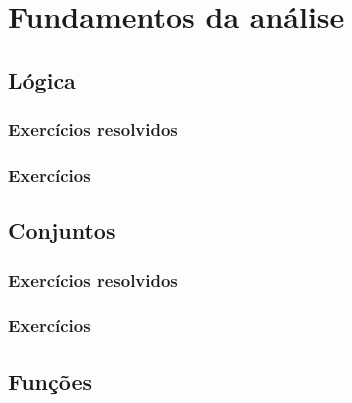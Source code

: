 
\chapter{Fundamentos da análise}\label{cap:fundamentos_da_analise}

\emconstrucao

\section{Lógica}\label{sec:logica}

\construirSec

\subsection*{Exercícios resolvidos}

\construirExeresol

\subsection*{Exercícios}

\construirExer

\section{Conjuntos}\label{sec:conjuntos}

\construirSec

\subsection*{Exercícios resolvidos}

\construirExeresol

\subsection*{Exercícios}

\construirExer

\section{Funções}\label{sec:função}

